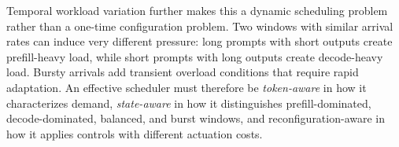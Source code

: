 Temporal workload variation further makes this a dynamic scheduling problem rather than a one-time configuration problem. 
Two windows with similar arrival rates can induce very different pressure: long prompts with short outputs create prefill-heavy load, while short prompts with long outputs create decode-heavy load. 
Bursty arrivals add transient overload conditions that require rapid adaptation. An effective scheduler must therefore be \emph{token-aware} in how it characterizes demand, \emph{state-aware} in how it distinguishes prefill-dominated, decode-dominated, balanced, and burst windows, and reconfiguration-aware in how it applies controls with different actuation costs.


